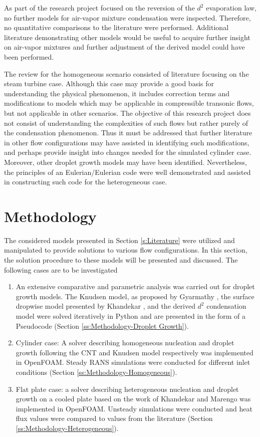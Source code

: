 \documentclass[12pt]{article}
\numberwithin{equation}{section}
\begin{document}
As part of the research project focused on the reversion of the $d^{2}$ evaporation law, no further models for air-vapor mixture condensation were inspected. Therefore, no quantitative comparisons to the literature were performed. Additional literature demonstrating other models would be useful to acquire further insight on air-vapor mixtures and further adjustment of the derived model could have been performed.

The review for the homogeneous scenario consisted of literature focusing on the steam turbine case. Although this case may provide a good basis for understanding the physical phenomenon, it includes correction terms and modifications to models which may be applicable in compressible transonic flows, but not applicable in other scenarios. The objective of this research project does not consist of understanding the complexities of such flows but rather purely of the condensation phenomenon. Thus it must be addressed that further literature in other flow configurations may have assisted in identifying such modifications, and perhaps provide insight into changes needed for the simulated cylinder case. Moreover, other droplet growth models may have been identified. Nevertheless, the principles of an Eulerian/Eulerian code were well demonstrated and assisted in constructing such code for the heterogeneous case. 


\newpage
\section{Methodology}\label{s:Methodology}
The considered models presented in Section \ref{s:Literature} were utilized and manipulated to provide solutions to various flow configurations. In this section, the solution procedure to these models will be presented and discussed. The following cases are to be investigated
\begin{enumerate}
    \item An extensive comparative and parametric analysis was carried out for droplet growth models. The Knudsen model, as proposed by Gyarmathy \cite{gyarmathy1962grundlagen}, the surface dropwise model presented by Khandekar \cite{khandekar2020drop}, and the derived $d^{2}$ condensation model were solved iteratively in Python and are presented in the form of a Pseudocode (Section \ref{ss:Methodology-Droplet Growth}).
    \item Cylinder case: A solver describing homogeneous nucleation and droplet growth following the CNT and Knudsen model respectively was implemented in OpenFOAM. Steady RANS simulations were conducted for different inlet conditions (Section \ref{ss:Methodology-Homogeneous}).
    \item Flat plate case: a solver describing heterogeneous nucleation and droplet growth on a cooled plate based on the work of Khandekar and Marengo \cite{khandekar2020drop,marengo2022surface} was implemented in OpenFOAM. Unsteady simulations were conducted and heat flux values were compared to values from the literature (Section \ref{ss:Methodology-Heterogeneous}).
\end{enumerate} 
 
\end{document}
